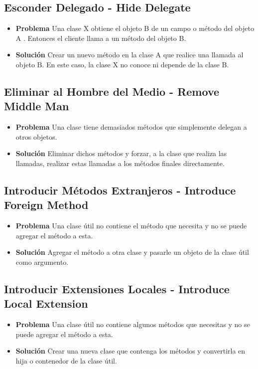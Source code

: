 \documentclass[11pt,a4paper,oneside]{book}
\begin{document}
\subsection{Esconder Delegado - Hide Delegate}
\begin{itemize}
    \item \textbf{Problema} Una clase X obtiene el objeto B de un campo o método del objeto A . Entonces el cliente llama a un método del objeto B.
    \item \textbf{Solución} Crear un nuevo método en la clase A que realice una llamada al objeto B. En este caso, la clase X no conoce ni depende de la clase B.
\end{itemize}

\subsection{Eliminar al Hombre del Medio - Remove Middle Man} 
\begin{itemize}
    \item \textbf{Problema} Una clase tiene demasiados métodos que simplemente delegan a otros objetos.
    \item \textbf{Solución} Eliminar dichos métodos y forzar, a la clase que realiza las llamadas, realizar estas llamadas a los métodos finales directamente.
\end{itemize}

 \subsection{Introducir Métodos Extranjeros - Introduce Foreign Method}  
 \label{introduceforeignmethod}
 \begin{itemize}
    \item \textbf{Problema}  Una clase útil no contiene el método que necesita y no se puede agregar el método a esta.
    
    
    
    \item \textbf{Solución} Agregar el método a otra clase y pasarle un objeto de la clase útil como argumento.
    
    
\end{itemize}

\subsection{Introducir Extensiones Locales - Introduce Local Extension}  
    \begin{itemize}
    \item \textbf{Problema} Una clase útil no contiene algunos métodos que necesitas y no se puede agregar el método a esta.
    \item \textbf{Solución} Crear una nueva clase que contenga los métodos y convertirla en hija o contenedor de la clase útil.
\end{itemize}
\end{document}
